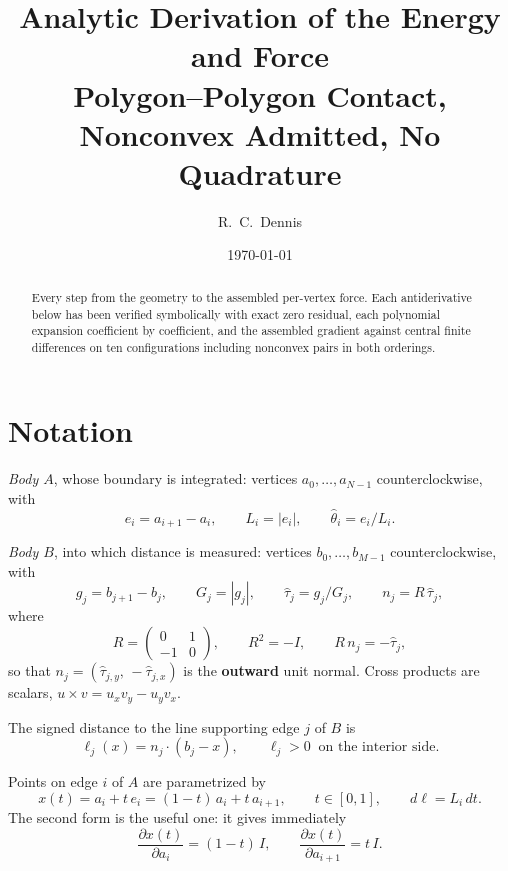 \documentclass[11pt]{article}
\title{Analytic Derivation of the Energy and Force\\[0.3em]
\large Polygon--Polygon Contact, Nonconvex Admitted, No Quadrature}
\author{R.\ C.\ Dennis}
\date{\today}
\newcommand{\that}{\hat\theta}
\newcommand{\tauh}{\hat\tau}
\begin{document}
\maketitle

\begin{abstract}
\noindent
Every step from the geometry to the assembled per-vertex force. Each antiderivative below has been verified symbolically with exact zero residual, each polynomial expansion coefficient by coefficient, and the assembled gradient against central finite differences on ten configurations including nonconvex pairs in both orderings.
\end{abstract}

\section{Notation}
\label{sec:notation}

\emph{Body $A$}, whose boundary is integrated: vertices $a_0,\dots,a_{N-1}$ counterclockwise, with
\begin{equation}
e_i = a_{i+1}-a_i, \qquad L_i = |e_i|, \qquad \that_i = e_i/L_i .
\end{equation}

\emph{Body $B$}, into which distance is measured: vertices $b_0,\dots,b_{M-1}$ counterclockwise, with
\begin{equation}
g_j = b_{j+1}-b_j, \qquad G_j = |g_j|, \qquad \tauh_j = g_j/G_j, \qquad n_j = R\,\tauh_j,
\end{equation}
where
\begin{equation}
R = \begin{pmatrix} 0 & 1\\ -1 & 0\end{pmatrix}, \qquad R^2 = -I, \qquad R\,n_j = -\tauh_j,
\end{equation}
so that $n_j = (\tauh_{j,y},\,-\tauh_{j,x})$ is the \textbf{outward} unit normal. Cross products are scalars, $u\times v = u_xv_y - u_yv_x$.

The signed distance to the line supporting edge $j$ of $B$ is
\begin{equation}
\ell_j(x) = n_j\cdot(b_j-x), \qquad \ell_j > 0 \ \text{ on the interior side.}
\label{eq:elldef}
\end{equation}

Points on edge $i$ of $A$ are parametrized by
\begin{equation}
x(t) = a_i + t\,e_i = (1-t)\,a_i + t\,a_{i+1}, \qquad t\in[0,1], \qquad d\ell = L_i\,dt .
\label{eq:param}
\end{equation}
The second form is the useful one: it gives immediately
\begin{equation}
\frac{\partial x(t)}{\partial a_i} = (1-t)\,I, \qquad \frac{\partial x(t)}{\partial a_{i+1}} = t\,I .
\label{eq:dxda}
\end{equation}
\end{document}
